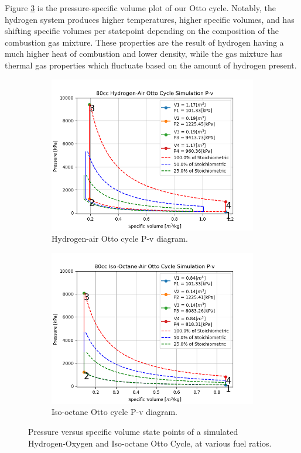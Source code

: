 \documentclass[conf]{new-aiaa}
\begin{document}
Figure \ref{fig:pv_diag} is the pressure-specific volume plot of our Otto cycle. Notably, the hydrogen system produces higher temperatures, higher specific volumes, and has shifting specific volumes per statepoint depending on the composition of the combustion gas mixture. These properties are the result of hydrogen having a much higher heat of combustion and lower density, while the gas mixture has thermal gas properties which fluctuate based on the amount of hydrogen present.

\begin{figure}[H]
\centering
\begin{subfigure}{0.5\linewidth}
  \centering
  \includegraphics[width=1\linewidth]{Figures/Hydrogen/P-V_specific.png}
  \caption{Hydrogen-air Otto cycle P-v diagram.}
  \label{fig:p-v_diag_h2}
\end{subfigure}%
\begin{subfigure}{0.5\linewidth}
  \centering
  \includegraphics[width=1\linewidth]{Figures/Iso-octane/P-V_specific.png}
  \caption{Iso-octane Otto cycle P-v diagram.}
  \label{fig:p-v_diag_iso}
\end{subfigure}
\caption{Pressure versus specific volume state points of a simulated Hydrogen-Oxygen and Iso-octane Otto Cycle, at various fuel ratios.}
\label{fig:pv_diag}
\end{figure}
\end{document}
